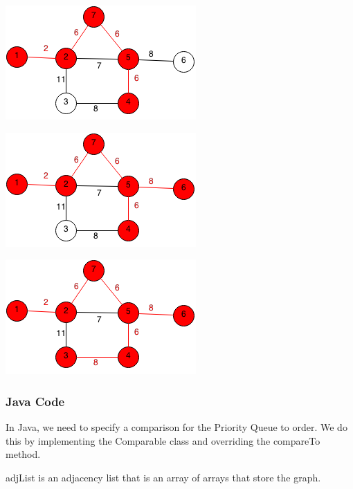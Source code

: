 \documentclass[11pt,oneside]{book}
\makeatletter
\def\maxwidth#1{\ifdim\Gin@nat@width>#1 #1\else\Gin@nat@width\fi}
\makeatother
\begin{document}
\includegraphics[width=\maxwidth{\textwidth}]{prim5.png}

\includegraphics[width=\maxwidth{\textwidth}]{prim6.png}

\includegraphics[width=\maxwidth{\textwidth}]{prim7.png}

\subsubsection{Java Code}

In Java, we need to specify a comparison for the Priority Queue to order. We do this by implementing the Comparable class and overriding the compareTo method.

adjList is an adjacency list that is an array of arrays that store the graph.
\end{document}
